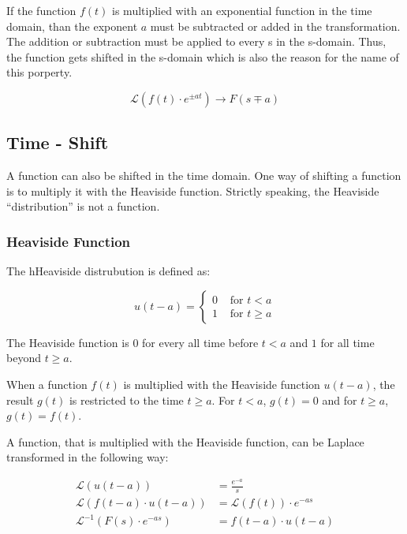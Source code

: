 \documentclass[./\jobname.tex]{subfiles}
\begin{document}
If the function $f(t)$ is multiplied with an exponential function in the time domain, than the exponent $a$ must be subtracted or added in the transformation. The addition or subtraction must be applied to every s in the s-domain. Thus, the function gets shifted in the s-domain which is also the reason for the name of this porperty.

\begin{equation}
	\mathcal{L} \left(f(t) \cdot e^{\pm at}\right) \rightarrow F(s \mp a)
\end{equation} 


\subsection{Time - Shift}

A function can also be shifted in the time domain. One way of shifting a function is to multiply it with the Heaviside function. Strictly speaking, the Heaviside ``distribution'' is not a function. 

\subsubsection{Heaviside Function}

The hHeaviside distrubution is defined as: 

\begin{equation}
	u(t-a) = 
	\begin{cases}
	0 & \text{ for } t < a \\
	1 & \text{ for } t \geq a
	\end{cases}
\end{equation}

The Heaviside function is $0$ for every all time before $t < a$ and $1$ for all time beyond $t \geq a$. 

When a function $f(t)$ is multiplied with the Heaviside function $u(t-a)$, the result $g(t)$ is restricted to the time $t \geq a$. For $t < a$, $g(t) = 0$ and for $t \geq a$, $g(t) = f(t)$. 

A function, that is multiplied with the Heaviside function, can be Laplace transformed in the following way:

\begin{equation}
\begin{split}
\mathcal{L}\left( u(t-a) \right) & = \frac{e^{-a}}{s} \\
\mathcal{L}\left( f(t-a) \cdot u(t-a) \right) & = \mathcal{L}\left( f(t) \right) \cdot e^{-as} \\
\mathcal{L}^{-1}\left( F(s) \cdot e^{-as} \right) & = f(t-a) \cdot u(t-a)
\end{split}
\end{equation}
\end{document}
